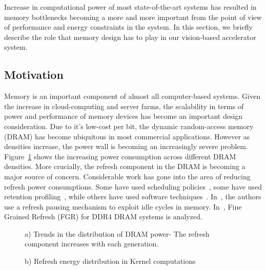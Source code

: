 Increase in computational power of most state-of-the-art systems has resulted in memory bottlenecks becoming a more and more important from the point of view of performance and energy constraints in the system.
In this section, we briefly describe the role that memory design has to play in our vision-based accelerator system.

\subsection{Motivation}
Memory is an important component of almost all computer-based systems. Given the increase in cloud-computing and server farms, the scalability in terms of power and performance of memory devices has become an important design consideration. Due to it's low-cost per bit, the dynamic random-access memory (DRAM) has become ubiquitous in most commercial applications. However as densities increase, the power wall is becoming an increasingly severe problem. Figure~\ref{fig:refreshTrends} shows the increasing power consumption across different DRAM densities. More crucially, the refresh component in the DRAM is becoming a major source of concern. 
Considerable work has gone into the area of reducing refresh power consumptions. Some have used scheduling policies~\cite{Stuecheli2010}, some have used retention profiling~\cite{Liu2012}, while others have used software techniques~\cite{Liu2012}. In~\cite{Nair2013}, the authors use a refresh pausing mechanism to exploit idle cycles in memory. In~\cite{Mukundan2013}, Fine Grained Refresh (FGR) for DDR4 DRAM systems is analyzed.  


\begin{figure}[ht!]
\begin{minipage}[b]{1\linewidth}
\centering
{}
\caption{\label{fig:refreshTrends}a) Trends in the distribution of DRAM power- The refresh component increases with each generation.}
\end{minipage}
\addtocounter{figure}{-1}
\begin{minipage}[b]{1\linewidth}
\centering
{}
\caption{\label{fig:refreshTrends}b) Refresh energy distribution in Kernel computations}
\end{minipage}
\addtocounter{figure}{-1}
\end{figure}

